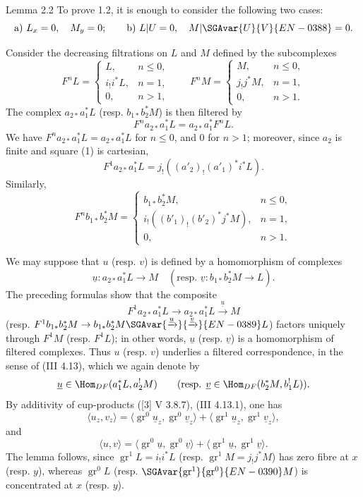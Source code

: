 \begin{statement}{Lemma 2.2}
To prove 1.2, it is enough to consider the following two cases:
\[
\text{a) } L_x=0,\quad M_y=0;\qquad
\text{b) } L|U=0,\quad M|\SGAvar{U}{V}{EN-0388}=0 .
\]
\end{statement}

Consider the decreasing filtrations on $L$ and $M$ defined by the subcomplexes
\[
F^nL=
\begin{cases}
L,& n\le 0,\\
i_!i^*L,& n=1,\\
0,& n>1,
\end{cases}
\qquad
F^nM=
\begin{cases}
M,& n\le 0,\\
j_!j^*M,& n=1,\\
0,& n>1.
\end{cases}
\]
The complex $a_{2*}a_1^*L$ (resp. $b_{1*}b_2^*M$) is then filtered by
\[
F^n a_{2*}a_1^*L=a_{2*}a_1^*F^nL.
\]
We have $F^n a_{2*}a_1^*L=a_{2*}a_1^*L$ for $n\le0$, and $0$ for $n>1$; moreover, since $a_2$ is finite and square (1) is cartesian,
\[
F^1a_{2*}a_1^*L=j_!((a'_2)_!(a'_1)^*i^*L).
\]
Similarly,
\[
F^n b_{1*}b_2^*M=
\begin{cases}
b_{1*}b_2^*M,& n\le 0,\\
i_!((b'_1)_!(b'_2)^*j^*M),& n=1,\\
0,& n>1.
\end{cases}
\]

We may suppose that $u$ (resp. $v$) is defined by a homomorphism of complexes
\[
\underline{u}:a_{2*}a_1^*L\longrightarrow M
\quad
(\text{resp. }\underline{v}:b_{1*}b_2^*M\longrightarrow L).
\]
The preceding formulas show that the composite
\[
F^1a_{2*}a_1^*L\longrightarrow a_{2*}a_1^*L\xrightarrow{\underline{u}}M
\]
(resp. $F^1b_{1*}b_2^*M\to b_{1*}b_2^*M\SGAvar{\xrightarrow{\underline{u}}}{\xrightarrow{\underline{v}}}{EN-0389}L$) factors uniquely through $F^1M$ (resp. $F^1L$); in other words, $\underline{u}$ (resp. $\underline{v}$) is a homomorphism of filtered complexes. Thus $u$ (resp. $v$) underlies a filtered correspondence, in the sense of (III 4.13), which we again denote by
\[
\underline{u}\in\Hom_{DF}(a_1^*L,a_2^!M)\qquad
(\text{resp. }\underline{v}\in\Hom_{DF}(b_2^*M,b_1^!L)).
\]
By additivity of cup-products ([3] V 3.8.7), (III 4.13.1), one has
\[
\langle u_z,v_z\rangle
 =\langle \operatorname{gr}^0\underline{u}_z,\operatorname{gr}^0\underline{v}_z\rangle
 +\langle \operatorname{gr}^1\underline{u}_z,\operatorname{gr}^1\underline{v}_z\rangle,
\]
and
\[
\langle u,v\rangle
 =\langle \operatorname{gr}^0\underline{u},\operatorname{gr}^0\underline{v}\rangle
 +\langle \operatorname{gr}^1\underline{u},\operatorname{gr}^1\underline{v}\rangle.
\]
The lemma follows, since $\operatorname{gr}^1L=i_!i^*L$ (resp. $\operatorname{gr}^1M=j_!j^*M$) has zero fibre at $x$ (resp. $y$), whereas $\operatorname{gr}^0L$ (resp. $\SGAvar{\operatorname{gr}^1}{\operatorname{gr}^0}{EN-0390}M$) is concentrated at $x$ (resp. $y$).

